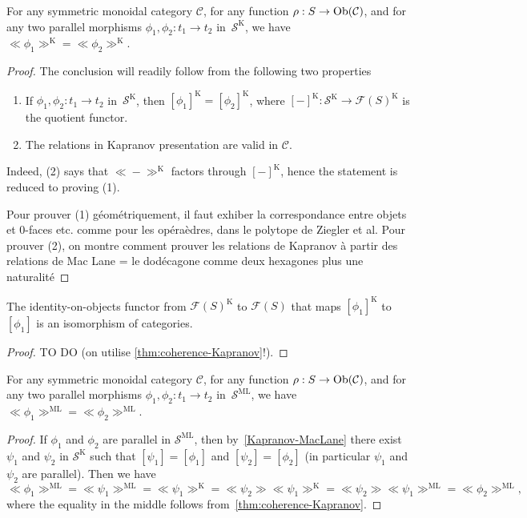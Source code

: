 \begin{proposition}
\label{thm:coherence-Kapranov}
    For any symmetric monoidal category $\mathcal{C}$, for any  function $\rho : S \to \mathrm{Ob}(\mathcal{C})$, and for any two parallel morphisms $\phi_1,\phi_2: t_1 \to t_2$ in~$\mathcal{S}^{\mathrm{K}}$, we have $\ll\!\phi_1\!\gg^{\mathrm{K}}=\ll\!\phi_2\!\gg^{\mathrm{K}}$.
\end{proposition}
\begin{proof}
The conclusion will readily follow from the following two properties
\begin{enumerate}
\item If $\phi_1,\phi_2: t_1 \to t_2$ in~$\mathcal{S}^{\mathrm{K}}$, then $[\phi_1]^{\mathrm{K}}=[\phi_2]^{\mathrm{K}}$, where $[-]^{\mathrm{K}}:\mathcal{S}^{\mathrm{K}}\to  \mathcal{F}(S)^{\mathrm{K}}$ is the quotient functor.  
\item The relations in Kapranov presentation are valid in $\mathcal C$.
\end{enumerate} 
Indeed, (2) says that $\ll\!-\!\gg^{\mathrm{K}}$ factors through $[-]^{\mathrm{K}}$, hence the statement is reduced to proving (1).

{\color{blue} Pour prouver (1) géométriquement, il faut exhiber la correspondance entre objets et 0-faces etc. comme pour les opéraèdres, dans le polytope de Ziegler et al. Pour prouver (2), on montre comment prouver les relations de Kapranov à partir des relations de Mac Lane = le dodécagone comme deux hexagones plus une naturalité}
\end{proof}

\begin{proposition} \label{Kapranov-MacLane}
The identity-on-objects  functor from  $\mathcal{F}(S)^{\mathrm{K}}$ to 
$\mathcal{F}(S)$ that maps $[\phi_1]^{\mathrm{K}}$ to $[\phi_1]$ is an isomorphism of categories.
\end{proposition}

\begin{proof}
TO DO (on utilise \cref{thm:coherence-Kapranov}!).
\end{proof}

\begin{thm}
\label{thm:coherence-MacLane}
    For any symmetric monoidal category $\mathcal{C}$, for any  function $\rho : S \to \mathrm{Ob}(\mathcal{C})$, and for any two parallel morphisms $\phi_1,\phi_2: t_1 \to t_2$ in~$\mathcal{S}^{\mathrm{ML}}$, we have $\ll\!\phi_1\!\gg^{\mathrm{ML}}=\ll\!\phi_2\!\gg^{\mathrm{ML}}$.
\end{thm}
\begin{proof} 
If $\phi_1$ and $\phi_2$ are parallel in $\mathcal{S}^{\mathrm{ML}}$, then by~\cref{Kapranov-MacLane}
there exist $\psi_1$ and $\psi_2$ in $\mathcal{S}^{\mathrm{K}}$ such that $[\psi_1]=[\phi_1]$ and 
$[\psi_2]=[\phi_2]$
 (in particular $\psi_1$ and $\psi_2$ are parallel).
Then we have  
$$\ll\!\phi_1\!\gg^{\mathrm{ML}} = \ll\!\psi_1\!\gg^{\mathrm{ML}}= \ll\!\psi_1\!\gg^{\mathrm{K}} 
=  \ll\!\psi_2\!\gg\ll\!\psi_1\!\gg^{\mathrm{K}} 
 =  \ll\!\psi_2\!\gg\ll\!\psi_1\!\gg^{\mathrm{ML}} =  \ll\!\phi_2\!\gg^{\mathrm{ML}},$$ 
 where the equality in the middle 
follows from~\cref{thm:coherence-Kapranov}.
\end{proof}

